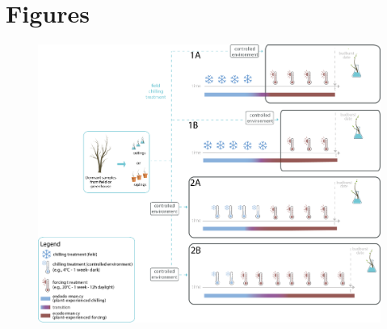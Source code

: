 \documentclass{article}
\begin{document}
\section* {Figures}
\begin{figure}[h!]
\centering
\noindent 
\includegraphics[width=1\textwidth]{figures/concept/Fig_bbconcept_dormant_V8.png}


\end{figure}
\end{document}

